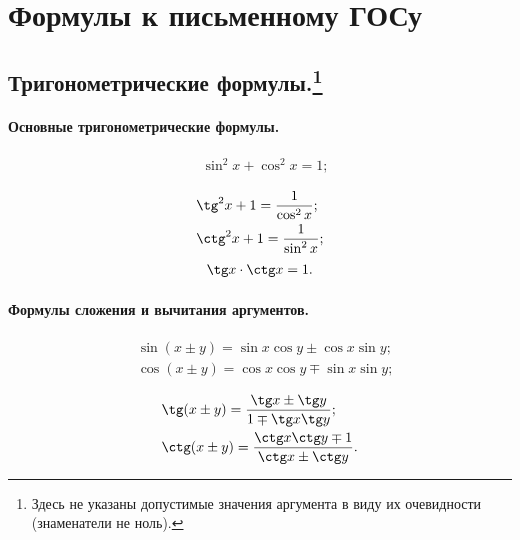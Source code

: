 \chapter{Формулы к письменному ГОСу}


\section[Тригонометрические формулы.]{Тригонометрические формулы.\footnote{Здесь не указаны допустимые значения аргумента в виду их очевидности (знаменатели не ноль).}}
\subsubsection{Основные тригонометрические формулы.}
\vspace*{-1.8\baselineskip}
\begin{multicols}{3}
\begin{align*}
&\sin^2x+\cos^2x=1;\\
\end{align*}
\vfill
\columnbreak
\begin{align*}
&\tg^2x+1=\frac{1}{\cos^2x};\\
&\ctg^2x+1=\frac{1}{\sin^2x};
\end{align*}
\vfill
\columnbreak
\begin{align*}
&\tg x\cdot\ctg x=1.\\
\end{align*}
\vfill
\end{multicols}
\subsubsection{Формулы сложения и вычитания аргументов.}
\vspace*{-1.8\baselineskip}
\begin{multicols}{2}
\begin{align*}
&\sin(x\pm y)=\sin x \cos y \pm \cos x \sin y;\\
&\cos(x\pm y)= \cos x \cos y \mp \sin x \sin y;\\
\end{align*}
\vfill
\columnbreak
\begin{align*}
&\tg(x\pm y)=\frac{\tg x \pm \tg y}{1 \mp \tg x\tg y};\\
&\ctg(x\pm y)=\frac{\ctg x\ctg y \mp 1}{\ctg x \pm \ctg y}.
\end{align*}
\end{multicols}
